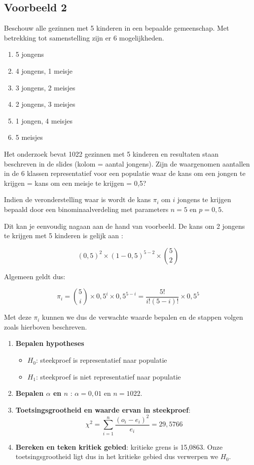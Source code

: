 \subsection{Voorbeeld 2}

Beschouw alle gezinnen met 5 kinderen in een bepaalde gemeenschap. Met betrekking tot samenstelling zijn er 6 mogelijkheden. 
\begin{enumerate}
	\item 5 jongens
	\item 4 jongens, 1 meisje
	\item 3 jongens, 2 meisjes
	\item 2 jongens, 3 meisjes
	\item 1 jongen, 4 meisjes
	\item 5 meisjes
\end{enumerate}

Het onderzoek bevat 1022 gezinnen met 5 kinderen en resultaten staan beschreven in de slides (kolom = aantal jongens). Zijn de waargenomen aantallen in de 6 klassen representatief voor een populatie waar de kans om een jongen te krijgen = kans om een meisje te krijgen = 0,5?

Indien de veronderstelling waar is wordt de kans $\pi_{i}$ om $i$ jongens te krijgen bepaald door een binominaalverdeling met parameters $n=5$ en $p=0,5$.

Dit kan je eenvoudig nagaan aan de hand van voorbeeld. De kans om 2 jongens te krijgen met 5 kinderen is gelijk aan :

\[ (0,5)^{2} \times (1-0,5)^{5-2} \times \binom{5}{2} \]
 
Algemeen geldt dus:

\[ \pi_{i} = \binom{5}{i}\times 0,5^{i} \times 0,5^{5-i} = \frac{5!}{i!(5-i)!}\times 0,5^{5} \]

Met deze $\pi_{i}$ kunnen we dus de verwachte waarde bepalen en de stappen volgen zoals hierboven beschreven. 

\begin{enumerate}
	\item \textbf{Bepalen hypotheses}
		
		\begin{itemize}
			\item $H_{0}$: steekproef is representatief naar populatie
			\item $H_{1}$: steekproef is niet representatief naar populatie
		\end{itemize}
	\item \textbf{Bepalen $\alpha$ en $n$} : $\alpha = 0,01$ en $n = 1022$.
	\item \textbf{Toetsingsgrootheid en waarde ervan in steekproef}:
	\[ \chi^{2} = \sum_{i=1}^{n} \frac{(o_{i} - e_{i})^{2}}{e_{i}} = 29,5766 \]
	\item \textbf{Bereken en teken kritiek gebied}:  kritieke grens is 15,0863. Onze toetsingsgrootheid ligt dus in het kritieke gebied dus verwerpen we $H_{0}$. 
\end{enumerate}

